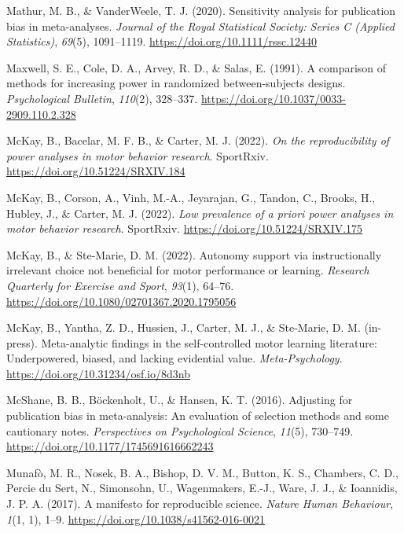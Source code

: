 \documentclass[
  man, donotrepeattitle,floatsintext]{apa7}
\newlength{\cslhangindent}
\newlength{\cslentryspacingunit} %
\newenvironment{CSLReferences}[2] %
 {%
  \setlength{\parindent}{0pt}
  \ifodd #1
  \let\oldpar\par
  \def\par{\hangindent=\cslhangindent\oldpar}
  \fi
  \setlength{\parskip}{#2\cslentryspacingunit}
 }%
 {}
\begin{document}
\begin{CSLReferences}{1}{0}
\leavevmode{}%
Mathur, M. B., \& VanderWeele, T. J. (2020). Sensitivity analysis for publication bias in meta-analyses. \emph{Journal of the Royal Statistical Society: Series C (Applied Statistics)}, \emph{69}(5), 1091--1119. \url{https://doi.org/10.1111/rssc.12440}

\leavevmode{}%
Maxwell, S. E., Cole, D. A., Arvey, R. D., \& Salas, E. (1991). A comparison of methods for increasing power in randomized between-subjects designs. \emph{Psychological Bulletin}, \emph{110}(2), 328--337. \url{https://doi.org/10.1037/0033-2909.110.2.328}

\leavevmode{}%
McKay, B., Bacelar, M. F. B., \& Carter, M. J. (2022). \emph{On the reproducibility of power analyses in motor behavior research}. {SportRxiv}. \url{https://doi.org/10.51224/SRXIV.184}

\leavevmode{}%
McKay, B., Corson, A., Vinh, M.-A., Jeyarajan, G., Tandon, C., Brooks, H., Hubley, J., \& Carter, M. J. (2022). \emph{Low prevalence of a priori power analyses in motor behavior research}. {SportRxiv}. \url{https://doi.org/10.51224/SRXIV.175}

\leavevmode{}%
McKay, B., \& Ste-Marie, D. M. (2022). Autonomy support via instructionally irrelevant choice not beneficial for motor performance or learning. \emph{Research Quarterly for Exercise and Sport}, \emph{93}(1), 64--76. \url{https://doi.org/10.1080/02701367.2020.1795056}

\leavevmode{}%
McKay, B., Yantha, Z. D., Hussien, J., Carter, M. J., \& Ste-Marie, D. M. (in-press). Meta-analytic findings in the self-controlled motor learning literature: Underpowered, biased, and lacking evidential value. \emph{Meta-Psychology}. \url{https://doi.org/10.31234/osf.io/8d3nb}

\leavevmode{}%
McShane, B. B., Böckenholt, U., \& Hansen, K. T. (2016). Adjusting for publication bias in meta-analysis: An evaluation of selection methods and some cautionary notes. \emph{Perspectives on Psychological Science}, \emph{11}(5), 730--749. \url{https://doi.org/10.1177/1745691616662243}

\leavevmode{}%
Munafò, M. R., Nosek, B. A., Bishop, D. V. M., Button, K. S., Chambers, C. D., Percie du Sert, N., Simonsohn, U., Wagenmakers, E.-J., Ware, J. J., \& Ioannidis, J. P. A. (2017). A manifesto for reproducible science. \emph{Nature Human Behaviour}, \emph{1}(1, 1), 1--9. \url{https://doi.org/10.1038/s41562-016-0021}


\end{CSLReferences}
\end{document}
